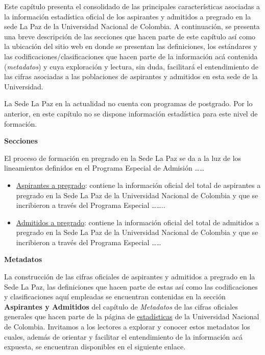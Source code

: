 \documentclass[
]{book}
\begin{document}
Este capítulo presenta el consolidado de las principales características asociadas a la información estadística oficial de los aspirantes y admitidos a pregrado en la sede La Paz de la Universidad Nacional de Colombia. A continuación, se presenta una breve descripción de las secciones que hacen parte de este capítulo así como la ubicación del sitio web en donde se presentan las definiciones, los estándares y las codificaciones/clasificaciones que hacen parte de la información acá contenida (\emph{metadatos}) y cuya exploración y lectura, sin duda, facilitará el entendimiento de las cifras asociadas a las poblaciones de aspirantes y admitidos en esta sede de la Universidad.

La Sede La Paz en la actualidad no cuenta con programas de postgrado. Por lo anterior, en este capítulo no se dispone información estadística para este nivel de formación.

\textbf{Secciones}

El proceso de formación en pregrado en la Sede La Paz se da a la luz de los lineamientos definidos en el Programa Especial de Admisión \ldots\ldots{}

\begin{itemize}
\item
  \protect\hyperlink{AspPre}{Aspirantes a pregrado}: contiene la información oficial del total de aspirantes a pregrado en la Sede La Paz de la Universidad Nacional de Colombia y que se incribieron a través del Programa Especial \ldots\ldots..
\item
  \protect\hyperlink{AdmPre}{Admitidos a pregrado}: contiene la información oficial del total de admitidos a pregrado en la Sede La Paz de la Universidad Nacional de Colombia y que se incribieron a través del Programa Especial \ldots\ldots{}
\end{itemize}

\textbf{Metadatos}

La construcción de las cifras oficiales de aspirantes y admitidos a pregrado en la Sede La Paz, las definiciones que hacen parte de estas así como las codificaciones y clasificaciones aquí empleadas se encuentran contenidas en la sección \textbf{Aspirantes y Admitidos} del capítulo de \emph{Metadatos} de las cifras oficiales generales que hacen parte de la página de \href{http://estadisticas.unal.edu.co/home/}{estadísticas} de la Universidad Nacional de Colombia. Invitamos a los lectores a explorar y conocer estos metadatos los cuales, además de orientar y facilitar el entendimiento de la información acá expuesta, se encuentran disponibles en el siguiente enlace.
\end{document}
